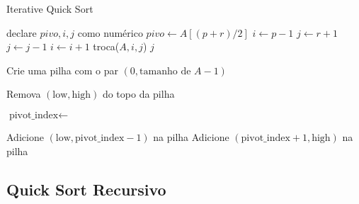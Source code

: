 \begin{algorithm}
    \caption{Iterative Quick Sort}
    \label{algo:iterative_quick_sort}
    \begin{algorithmic}[1]
        \Statex

            \State declare $pivo, i, j$ como numérico
            \State $pivo \gets A[(p + r) / 2]$
            \State $i \gets p - 1$
            \State $j \gets r + 1$
                \Repeat
                    \State $j \gets j - 1$
                \Repeat
                    \State $i \gets i + 1$
                    \State troca($A, i, j$)
                \EndIf
            \EndWhile
            \State \Return $j$
        \EndFunction
        \Statex
        
                \State \Return
            \EndIf
            \State Crie uma pilha com o par $(0, \text{tamanho de } A - 1)$
            
                \State Remova $(\text{low}, \text{high})$ do topo da pilha
                
                    \State $\text{pivot\_index} \gets$ 
                    
                        \State Adicione $(\text{low}, \text{pivot\_index} - 1)$ na pilha 
                    \EndIf
                    \State Adicione $(\text{pivot\_index} + 1, \text{high})$ na pilha 
                \EndIf
            \EndWhile
        \EndFunction
    \end{algorithmic}
\end{algorithm}


\subsection{Quick Sort Recursivo}


